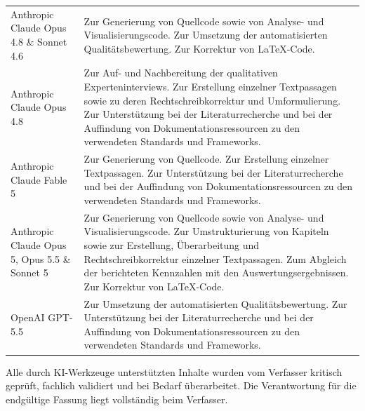 \begingroup
{}
\renewcommand{\arraystretch}{1.05}
\noindent
\begin{tabularx}{\textwidth}{@{\hspace{1.5em}}p{} X@{}}

Anthropic Claude \newline Opus 4.8 \& Sonnet 4.6 &
Zur Generierung von Quellcode sowie von Analyse- und Visualisierungscode. \newline
Zur Umsetzung der automatisierten Qualitätsbewertung. \newline
Zur Korrektur von \LaTeX-Code. \\[1.4em]

Anthropic Claude \newline Opus 4.8 &
Zur Auf- und Nachbereitung der qualitativen Experteninterviews. \newline
Zur Erstellung einzelner Textpassagen sowie zu deren Rechtschreibkorrektur und
Umformulierung. \newline
Zur Unterstützung bei der Literaturrecherche und bei der Auffindung von
Dokumentationsressourcen zu den verwendeten Standards und Frameworks. \\[1.4em]

Anthropic Claude \newline Fable 5 &
Zur Generierung von Quellcode. \newline
Zur Erstellung einzelner Textpassagen. \newline
Zur Unterstützung bei der Literaturrecherche und bei der Auffindung von
Dokumentationsressourcen zu den verwendeten Standards und Frameworks. \\[1.4em]

Anthropic Claude \newline Opus 5, Opus 5.5 \newline \& Sonnet 5 &
Zur Generierung von Quellcode sowie von Analyse- und Visualisierungscode. \newline
Zur Umstrukturierung von Kapiteln sowie zur Erstellung, Überarbeitung und
Rechtschreibkorrektur einzelner Textpassagen. \newline
Zum Abgleich der berichteten Kennzahlen mit den Auswertungsergebnissen. \newline
Zur Korrektur von \LaTeX-Code. \\[1.4em]

OpenAI \newline GPT-5.5 &
Zur Umsetzung der automatisierten Qualitätsbewertung. \newline
Zur Unterstützung bei der Literaturrecherche und bei der Auffindung von
Dokumentationsressourcen zu den verwendeten Standards und Frameworks. \\[1.4em]

\end{tabularx}
\endgroup

\medskip

\noindent
Alle durch KI-Werkzeuge unterstützten Inhalte wurden vom Verfasser kritisch geprüft,
fachlich validiert und bei Bedarf überarbeitet. Die Verantwortung für die endgültige
Fassung liegt vollständig beim Verfasser.

\pagebreak